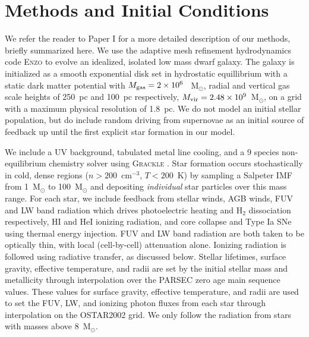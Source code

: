 \documentclass[twocolumn]{aastex62}
\begin{document}
\section{Methods and Initial Conditions} \label{sec:methods}
We refer the reader to Paper I for a more detailed description of our methods, briefly summarized here. We use the adaptive mesh refinement hydrodynamics code \textsc{Enzo} \citep{Enzo2014} to evolve an idealized, isolated low mass dwarf galaxy. The galaxy is initialized as a smooth exponential disk set in hydrostatic equillibrium with a static dark matter potential \citep{Burkert1995} with $M_{\rm gas} = 2 \times 10^6~$~M$_{\odot}$, radial and vertical gas scale heights of 250~pc and 100~pc respectively, $M_{\rm vir} = 2.48 \times 10^9$~M$_{\odot}$, on a grid with a maximum physical resolution of 1.8~pc. We do not model an initial stellar population, but do include random driving from supernovae as an initial source of feedback up until the first explicit star formation in our model.

We include a UV background, tabulated metal line cooling, and a 9 species non-equilibrium chemistry solver using \textsc{Grackle} \citep{GrackleMethod}. Star formation occurs stochastically in cold, dense regions ($n > 200$~cm$^{-3}$, $T < 200$~K) by sampling a \cite{Salpeter1955} Salpeter IMF from 1~M$_{\odot}$ to 100~M$_{\odot}$ and depositing \textit{individual} star particles over this mass range. For each star, we include feedback from stellar winds, AGB winds, FUV and LW band radiation which drives photoelectric heating and H$_2$ dissociation respectively, HI and HeI ionizing radiation, and core collapse and Type Ia SNe using thermal energy injection. FUV and LW band radiation are both taken to be optically thin, with local (cell-by-cell) attenuation alone. Ionizing radiation is followed using radiative transfer, as discussed below. Stellar lifetimes, surface gravity, effective temperature, and radii are set by the initial stellar mass and metallicity through interpolation over the PARSEC \citep{Bressan2012} zero age main sequence values. These values for surface gravity, effective temperature, and radii are used to set the FUV, LW, and ionizing photon fluxes from each star through interpolation on the OSTAR2002 \citep{LanzHubeny2003} grid. We only follow the radiation from stars with masses above 8~M$_{\odot}$. 
\end{document}
